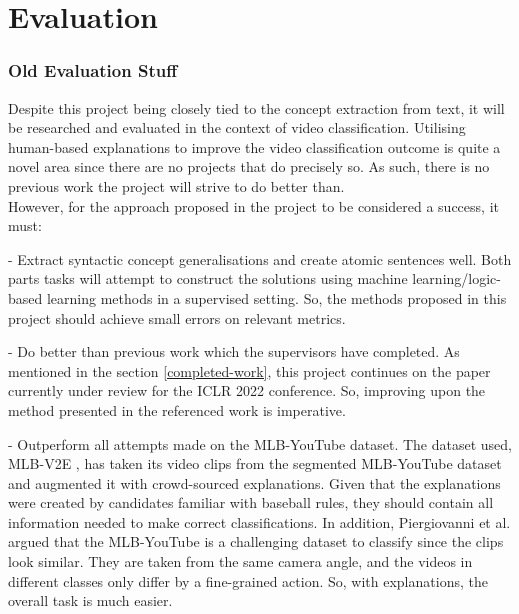 \chapter{Evaluation}


\subsection{Old Evaluation Stuff}

Despite this project being closely tied to the concept extraction from text, it will be researched and evaluated in the context of video classification.
Utilising human-based explanations to improve the video classification outcome is quite a novel area since there are no projects that do precisely so.
As such, there is no previous work the project will strive to do better than.\\

However, for the approach proposed in the project to be considered a success, it must:

 - Extract syntactic concept generalisations and create atomic sentences well. Both parts tasks will attempt to construct the solutions using machine learning/logic-based learning methods in a supervised setting. So, the methods proposed in this project should achieve small errors on relevant metrics.
 

 - Do better than previous work which the supervisors have completed. As mentioned in the section \ref{completed-work}, this project continues on the paper currently under review for the ICLR 2022 conference. So, improving upon the method presented in the referenced work is imperative.
 
 - Outperform all attempts made on the MLB-YouTube \cite{RefWorks:RefID:3-piergiovanni2018fine-grained} dataset. The dataset used, MLB-V2E \cite{RefWorks:RefID:16-2021automatic}, has taken its video clips from the segmented MLB-YouTube dataset and augmented it with crowd-sourced explanations. Given that the explanations were created by candidates familiar with baseball rules, they should contain all information needed to make correct classifications. 
 In addition, Piergiovanni et al. \cite{RefWorks:RefID:3-piergiovanni2018fine-grained} argued that the MLB-YouTube is a challenging dataset to classify since the clips look similar. They are taken from the same camera angle, and the videos in different classes only differ by a fine-grained action.
 So, with explanations, the overall task is much easier.
 

